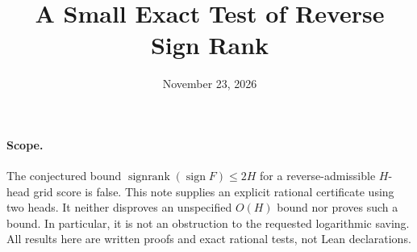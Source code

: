 \documentclass[11pt]{article}
\title{A Small Exact Test of Reverse Sign Rank}
\author{}
\date{November 23, 2026}
\begin{document}
\maketitle

\paragraph{Scope.}
The conjectured bound $\operatorname{signrank}(\operatorname{sign}F)\leq2H$
for a reverse-admissible $H$-head grid score is false. This note supplies an
explicit rational certificate using two heads. It neither disproves an
unspecified $O(H)$ bound nor proves such a bound. In particular, it is not
an obstruction to the requested logarithmic saving. All results here are
written proofs and exact rational tests, not Lean declarations.
\end{document}
